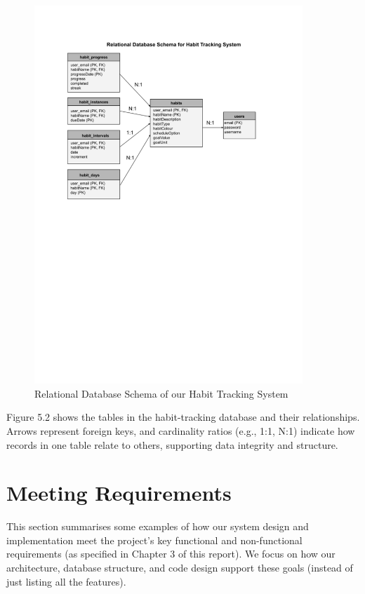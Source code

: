 \begin{figure}[H]
    \centering
    \includegraphics[width=0.9\textwidth]{resources/database_schema.pdf}
    \caption{Relational Database Schema of our Habit Tracking System}
    \label{fig:database_schema}
\end{figure}

Figure 5.2 shows the tables in the habit-tracking database and their relationships. Arrows represent foreign keys, and cardinality ratios (e.g., 1:1, N:1) indicate how records in one table relate to others, supporting data integrity and structure.

\section{Meeting Requirements}

This section summarises some examples of how our system design and implementation meet the project's key functional and non-functional requirements (as specified in Chapter 3 of this report). We focus on how our architecture, database structure, and code design support these goals (instead of just listing all the features).

